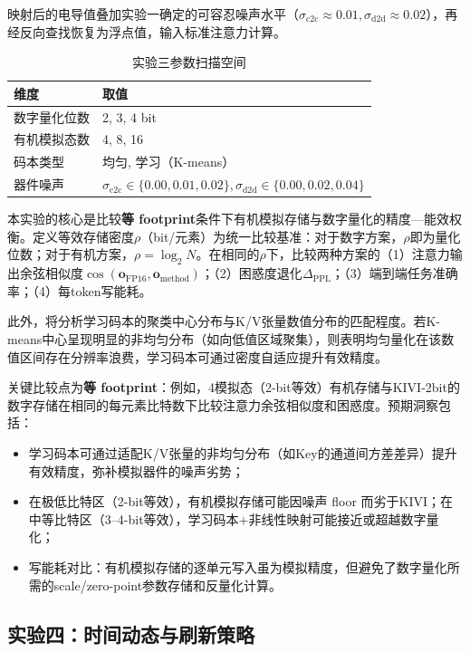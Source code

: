 映射后的电导值叠加实验一确定的可容忍噪声水平（$\sigma_{\text{c2c}} \approx 0.01, \sigma_{\text{d2d}} \approx 0.02$），再经反向查找恢复为浮点值，输入标准注意力计算。

\begin{table}[htbp]
\centering
\caption{实验三参数扫描空间}
\label{tab:exp3_grid}
\begin{tabular}{ll}
\toprule
维度 & 取值 \\
\midrule
数字量化位数 & 2, 3, 4 bit \\
有机模拟态数 & 4, 8, 16 \\
码本类型 & 均匀, 学习（K-means） \\
器件噪声 & $\sigma_{\text{c2c}} \in \{0.00, 0.01, 0.02\}, \sigma_{\text{d2d}} \in \{0.00, 0.02, 0.04\}$ \\
\bottomrule
\end{tabular}
\end{table}

本实验的核心是比较\textbf{等 footprint}条件下有机模拟存储与数字量化的精度—能效权衡。定义等效存储密度$\rho$（bit/元素）为统一比较基准：对于数字方案，$\rho$即为量化位数；对于有机方案，$\rho = \log_2 N$。在相同的$\rho$下，比较两种方案的（1）注意力输出余弦相似度$\cos(\mathbf{o}_{\text{FP16}}, \mathbf{o}_{\text{method}})$；（2）困惑度退化$\Delta_{\text{PPL}}$；（3）端到端任务准确率；（4）每token写能耗。

此外，将分析学习码本的聚类中心分布与K/V张量数值分布的匹配程度。若K-means中心呈现明显的非均匀分布（如向低值区域聚集），则表明均匀量化在该数值区间存在分辨率浪费，学习码本可通过密度自适应提升有效精度。

关键比较点为\textbf{等 footprint}：例如，4模拟态（2-bit等效）有机存储与KIVI-2bit的数字存储在相同的每元素比特数下比较注意力余弦相似度和困惑度。预期洞察包括：

\begin{itemize}
    \item 学习码本可通过适配K/V张量的非均匀分布（如Key的通道间方差差异）提升有效精度，弥补模拟器件的噪声劣势；
    \item 在极低比特区（2-bit等效），有机模拟存储可能因噪声 floor 而劣于KIVI；在中等比特区（3–4-bit等效），学习码本+非线性映射可能接近或超越数字量化；
    \item 写能耗对比：有机模拟存储的逐单元写入虽为模拟精度，但避免了数字量化所需的scale/zero-point参数存储和反量化计算。
\end{itemize}

\subsection{实验四：时间动态与刷新策略}
\label{sec:exp4_temporal}

